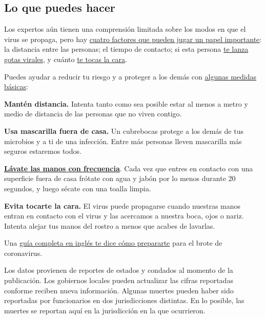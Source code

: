 \hypertarget{lo-que-puedes-hacer}{%
\subsection{Lo que puedes hacer}\label{lo-que-puedes-hacer}}

Los expertos aún tienen una comprensión limitada sobre los modos en que
el virus se propaga, pero hay
\href{https://www.nytimes3xbfgragh.onion/es/2020/03/03/espanol/ciencia-y-tecnologia/coronavirus-como-se-transmite.html}{cuatro
factores que pueden jugar un papel importante}: la distancia entre las
personas; el tiempo de contacto; si esta persona
\href{https://www.nytimes3xbfgragh.onion/es/2020/07/08/espanol/ciencia-y-tecnologia/coronavirus-aire-aerosoles.html}{te
lanza gotas virales}, y cuánto
\href{https://www.nytimes3xbfgragh.onion/es/2020/03/06/espanol/estilos-de-vida/no-te-toques-la-cara.html}{te
tocas la cara}.

Puedes ayudar a reducir tu riesgo y a proteger a los demás con
\href{https://www.nytimes3xbfgragh.onion/es/article/el-coronavirus-proteger-preparar.html}{algunas
medidas básicas}:

\textbf{Mantén distancia.} Intenta tanto como sea posible estar al menos
a metro y medio de distancia de las personas que no viven contigo.

\textbf{Usa mascarilla fuera de casa.} Un cubrebocas protege a los demás
de tus microbios y a ti de una infección. Entre más personas lleven
mascarilla más seguros estaremos todos.

\textbf{\href{https://www.nytimes3xbfgragh.onion/es/2020/03/19/espanol/ciencia-y-tecnologia/como-lavarse-las-manos-coronavirus.html}{Lávate
las manos con frecuencia}}. Cada vez que entres en contacto con una
superficie fuera de casa frótate con agua y jabón por lo menos durante
20 segundos, y luego sécate con una toalla limpia.

\textbf{Evita tocarte la cara.} El virus puede propagarse cuando
nuestras manos entran en contacto con el virus y las acercamos a nuestra
boca, ojos o nariz. Intenta alejar tus manos del rostro a menos que
acabes de lavarlas.

Una
\href{https://www.nytimes3xbfgragh.onion/interactive/2020/world/coronavirus-tips-advice.html}{guía
completa en inglés te dice cómo prepararte} para el brote de
coronavirus.

Los datos provienen de reportes de estados y condados al momento de la
publicación. Los gobiernos locales pueden actualizar las cifras
reportadas conforme reciben nueva información. Algunas muertes pueden
haber sido reportadas por funcionarios en dos jurisdicciones distintas.
En lo posible, las muertes se reportan aquí en la jurisdicción en la que
ocurrieron.


